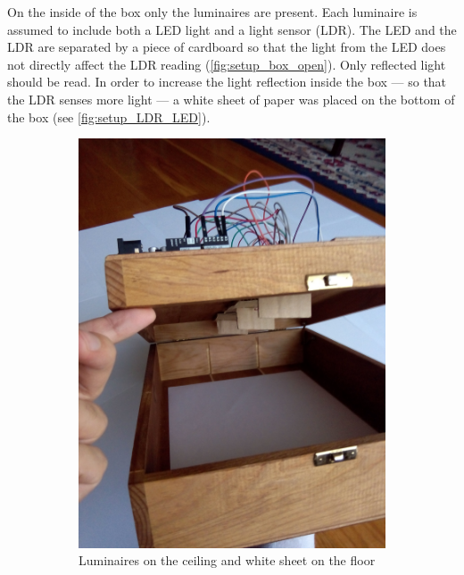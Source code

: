 On the inside of the box only the luminaires are present. Each luminaire is assumed to include both a LED light and a light sensor (LDR). The LED and the LDR are separated by a piece of cardboard so that the light from the LED does not directly affect the LDR reading (\autoref{fig:setup_box_open}). Only reflected light should be read. In order to increase the light reflection inside the box --- so that the LDR senses more light --- a white sheet of paper was placed on the bottom of the box (see \autoref{fig:setup_LDR_LED}).

\begin{figure}[h]
    \centering
    \begin{subfigure}[t]{0.49\textwidth}
        \centering
        \includegraphics[width=\textwidth]{img/setup_box_open}
        \caption{Luminaires on the ceiling and white sheet on the floor}
        \label{fig:setup_box_open}
    \end{subfigure}
    \begin{subfigure}[t]{0.49\textwidth}

\end{subfigure}
\end{figure}
